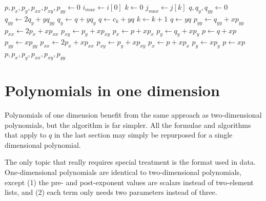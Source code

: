 \begin{algorithm}
\caption{Efficient evaluation of a polynomial of two variables}\label{alg:poly2}
\begin{algorithmic}[1]
 
\State $p, p_x, p_y, p_{xx}, p_{xy}, p_{yy} \gets 0$  
\State $i_{max} \gets i[0]$  
\State $k \gets 0$ 
   
     
        \State $j_{max} \gets j[k]$ 
        \State $q,q_y,q_{yy} \gets 0$   
         
            \State $q_{yy} \gets 2 q_y + y q_{yy}$
            \State $q_y \gets q + y q_y$
              
                \State $q \gets c_k + y q$
                \State $k \gets k+1$
            \Else   {}
                \State $q \gets y q$
            \EndIf
        \EndFor
        \State $p_{yy} \gets q_{yy} + x p_{yy}$
        \State $p_{xx} \gets 2 p_x + x p_{xx}$
        \State $p_{xy} \gets p_y + x p_{xy}$
        \State $p_x \gets p + x p_x$
        \State $p_y \gets q_y + x p_y$
        \State $p \gets q + x p$
    \Else {}
        \State $p_{yy} \gets x p_{yy}$
        \State $p_{xx} \gets 2 p_x + x p_{xx}$
        \State $p_{xy} \gets p_y + x p_{xy}$
        \State $p_x \gets p + x p_x$
        \State $p_y \gets x p_y$
        \State $p \gets x p$
    \EndIf
\EndFor
\State \Return $p,p_x,p_y,p_{xx},p_{xy},p_{yy}$
\EndProcedure
\end{algorithmic}
\end{algorithm}

\section{Polynomials in one dimension}\label{sec:num:poly1}

Polynomials of one dimension benefit from the same approach as two-dimensional polynomials, but the algorithm is far simpler.  All the formulae and algorithms that apply to $q$ in the last section may simply be repurposed for a single dimensional polynomial.  

The only topic that really requires special treatment is the format used in data.  One-dimensional polynomials are identical to two-dimensional polynomials, except (1) the pre- and post-exponent values are scalars instead of two-element lists, and (2) each term only needs two parameters instead of three.


